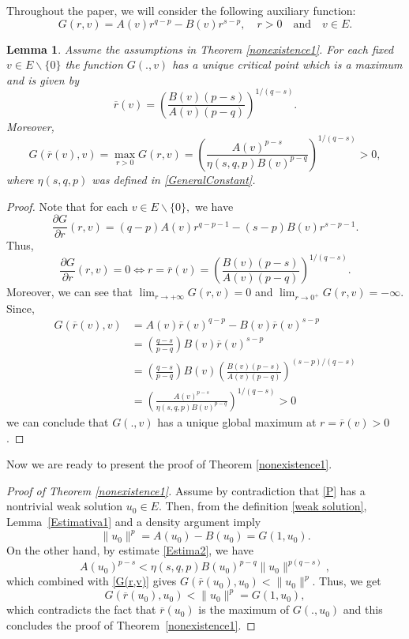\documentclass[12pt,reqno]{amsart}
\newtheorem{lemma}[theorem]{Lemma}
\begin{document}
Throughout the paper, we will consider the following auxiliary function:
\begin{equation}\label{G definition}
			G(r,v)=A(v)r^{q-p}-B(v)r^{s-p},\quad r>0\quad\mbox{and}\quad v\in E.
		\end{equation}	
\begin{lemma}\label{Max G}  Assume the assumptions in Theorem \ref{nonexistence1}. 
For each fixed $v \in E\backslash\{0\}$ the function $G(.,v)$  has a unique critical point which is a maximum and is given by	
		\begin{equation}\label{critical point r(v)}
			\overline{r}(v)=\left(\frac{B(v)(p-s)}{A(v)(p-q)}\right)^{1/(q-s)}.
		\end{equation}
		Moreover, 
		\begin{equation}\label{G(r,v)}
			G(\overline{r}(v),v)=	\max_{r>0}G(r,v)=\left(\frac{A(v)^{p-s}}{\eta(s,q,p)B(v)^{p-q}}\right)^{1/(q-s)}>0,
   \end{equation}
   where $\eta(s,q,p)$ was defined in \eqref{GeneralConstant}.
	\end{lemma}
\begin{proof} Note that for each $v \in E\backslash\{0\},$ we have
 $$
\frac{\partial G}{\partial r}(r,v)=(q-p)A(v)r^{q-p-1}-(s-p)B(v)r^{s-p-1}.
$$
 Thus, 
 $$
\frac{\partial G}{\partial r}(r,v)=0 \iff r=\overline{r}(v)=\left(\frac{B(v)(p-s)}{A(v)(p-q)}\right)^{1/(q-s)}.
$$
Moreover, we can see that $\lim_{r \rightarrow +\infty} G(r,v)=0$ and $\lim_{r\rightarrow 0^+}G(r,v)=-\infty$. Since, 
\begin{align*}
			G(\overline{r}(v),v)
   &=A(v)\overline{r}(v)^{q-p}-B(v)\overline{r}(v)^{s-p}\\
						&= \left(\frac{q-s}{p-q}\right)B(v)\overline{r}(v)^{s-p}\\
			&=\left(\frac{q-s}{p-q}\right)B(v) \left(\frac{B(v)(p-s)}{A(v)(p-q)}\right)^{(s-p)/(q-s)}\\
			&=\left(\frac{A(v)^{p-s}}{\eta(s,q,p) B(v)^{p-q}}\right)^{1/(q-s)}>0
		\end{align*}
we can conclude that $G(.,v)$ has a unique global maximum at $r=\overline{r}(v)>0$. 	\end{proof}
	
	Now we are ready to present the proof of Theorem \ref{nonexistence1}.
	
	\begin{proof}[Proof of Theorem \ref{nonexistence1}]
 Assume by contradiction that  \eqref{P} has a nontrivial weak solution $u_0\in E$. Then, from the definition \eqref{weak solution}, Lemma~\ref{Estimativa1} and a density argument imply
		$$
			\|u_0\|^p=A(u_0)-B(u_0)=G(1,u_0).
		$$
On the other hand, by estimate \eqref{Estima2}, we have 
		\begin{equation*}
			A(u_0)^{p-s}<\eta(s,q,p)B(u_0)^{p-q}\|u_0\|^{p(q-s)},
		\end{equation*}
which combined with \eqref{G(r,v)} gives
	$
			G(\overline{r}(u_0),u_0)<\|u_0\|^p.
	$
Thus, we get 
	$$
 G(\overline{r}(u_0),u_0)<\|u_0\|^p=G(1,u_0),
 $$
 which contradicts the fact that $\overline{r}(u_0)$ is the maximum of $G(.,u_0)$  and this concludes  the proof of Theorem~\ref{nonexistence1}.
	\end{proof}
		
\end{document}
